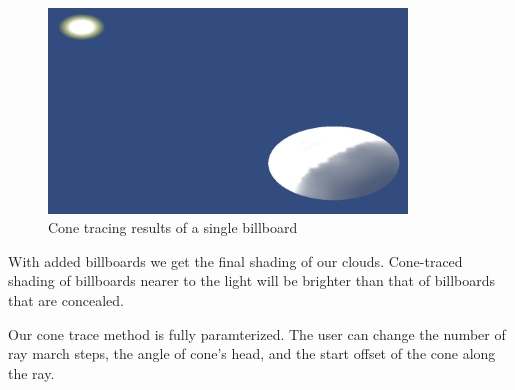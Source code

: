 \begin{figure}[h]
\centering
\includegraphics[width=0.85\textwidth]{../res/conetrace.png}
\caption{Cone tracing results of a single billboard}
\end{figure}

With added billboards we get the final shading of our clouds. Cone-traced shading of billboards nearer to the light will be brighter than that of billboards that are concealed. 

Our cone trace method is fully paramterized. The user can change the number of ray march steps, the angle of cone's head, and the start offset of the cone along the ray. 

